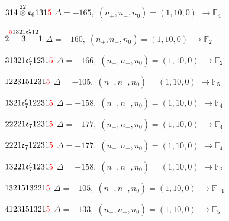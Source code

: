 \documentclass[10pt]{article}
\begin{document}
\smallskip

$314\overset{22}{\otimes}\mathfrak{e}_6131\textcolor{red}{5}$ \quad $\Delta=-165,\; (n_+,n_-,n_0)=(1,10,0)$ \quad $\to \mathbb{F}_{4}$

\smallskip

$2\overset{\textcolor{red}{5}1321\mathfrak{e}_7'12}{3}1$ \quad $\Delta=-160,\; (n_+,n_-,n_0)=(1,10,0)$ \quad $\to \mathbb{F}_{2}$

\smallskip

$31321\mathfrak{e}_7'1231\textcolor{red}{5}$ \quad $\Delta=-166,\; (n_+,n_-,n_0)=(1,10,0)$ \quad $\to \mathbb{F}_{2}$

\smallskip

$1223151231\textcolor{red}{5}$ \quad $\Delta=-105,\; (n_+,n_-,n_0)=(1,10,0)$ \quad $\to \mathbb{F}_{5}$

\smallskip

$1321\mathfrak{e}_7'12231\textcolor{red}{5}$ \quad $\Delta=-158,\; (n_+,n_-,n_0)=(1,10,0)$ \quad $\to \mathbb{F}_{4}$

\smallskip

$22221\mathfrak{e}_71231\textcolor{red}{5}$ \quad $\Delta=-177,\; (n_+,n_-,n_0)=(1,10,0)$ \quad $\to \mathbb{F}_{4}$

\smallskip

$2221\mathfrak{e}_712231\textcolor{red}{5}$ \quad $\Delta=-177,\; (n_+,n_-,n_0)=(1,10,0)$ \quad $\to \mathbb{F}_{4}$

\smallskip

$13221\mathfrak{e}_7'1231\textcolor{red}{5}$ \quad $\Delta=-158,\; (n_+,n_-,n_0)=(1,10,0)$ \quad $\to \mathbb{F}_{2}$

\smallskip

$1321513221\textcolor{red}{5}$ \quad $\Delta=-105,\; (n_+,n_-,n_0)=(1,10,0)$ \quad $\to \mathbb{F}_{-1}$

\smallskip

$4123151321\textcolor{red}{5}$ \quad $\Delta=-133,\; (n_+,n_-,n_0)=(1,10,0)$ \quad $\to \mathbb{F}_{5}$
\end{document}
